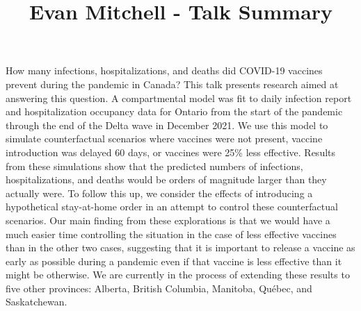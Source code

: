 \documentclass[12pt]{article}
\title{Evan Mitchell - Talk Summary}
\author{}
\date{}
\begin{document}
\maketitle

How many infections, hospitalizations, and deaths did COVID-19 vaccines prevent during the pandemic in Canada? This talk presents research aimed at answering this question. A compartmental model was fit to daily infection report and hospitalization occupancy data for Ontario from the start of the pandemic through the end of the Delta wave in December 2021. We use this model to simulate counterfactual scenarios where vaccines were not present, vaccine introduction was delayed 60 days, or vaccines were 25\% less effective. Results from these simulations show that the predicted numbers of infections, hospitalizations, and deaths would be orders of magnitude larger than they actually were. To follow this up, we consider the effects of introducing a hypothetical stay-at-home order in an attempt to control these counterfactual scenarios. Our main finding from these explorations is that we would have a much easier time controlling the situation in the case of less effective vaccines than in the other two cases, suggesting that it is important to release a vaccine as early as possible during a pandemic even if that vaccine is less effective than it might be otherwise. We are currently in the process of extending these results to five other provinces: Alberta, British Columbia, Manitoba, Qu\'{e}bec, and Saskatchewan.
\end{document}
